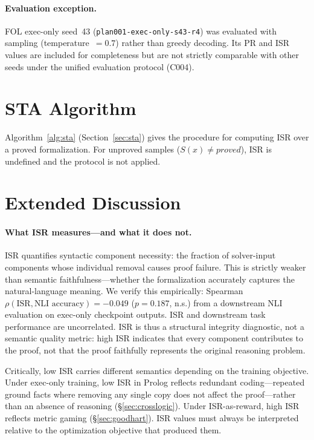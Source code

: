 \paragraph{Evaluation exception.}
FOL exec-only seed~43 (\texttt{plan001-exec-only-s43-r4}) was evaluated with sampling (temperature~$=0.7$) rather than greedy decoding.
Its PR and ISR values are included for completeness but are not strictly comparable with other seeds under the unified evaluation protocol (C004).


\section{STA Algorithm}
\label{app:algorithm}

Algorithm~\ref{alg:sta} (Section~\ref{sec:sta}) gives the procedure for computing ISR over a proved formalization.
For unproved samples ($S(x) \neq \textit{proved}$), ISR is undefined and the protocol is not applied.


\section{Extended Discussion}
\label{app:extended-discussion}

\paragraph{What ISR measures---and what it does not.}
ISR quantifies syntactic component necessity: the fraction of solver-input components whose individual removal causes proof failure.
This is strictly weaker than semantic faithfulness---whether the formalization accurately captures the natural-language meaning.
We verify this empirically: Spearman $\rho(\text{ISR}, \text{NLI accuracy}) = -0.049$ ($p = 0.187$, n.s.) from a downstream NLI evaluation on exec-only checkpoint outputs.
ISR and downstream task performance are uncorrelated.
ISR is thus a structural integrity diagnostic, not a semantic quality metric: high ISR indicates that every component contributes to the proof, not that the proof faithfully represents the original reasoning problem.

Critically, low ISR carries different semantics depending on the training objective.
Under exec-only training, low ISR in Prolog reflects redundant coding---repeated ground facts where removing any single copy does not affect the proof---rather than an absence of reasoning (\S\ref{sec:crosslogic}).
Under ISR-as-reward, high ISR reflects metric gaming (\S\ref{sec:goodhart}).
ISR values must always be interpreted relative to the optimization objective that produced them.


